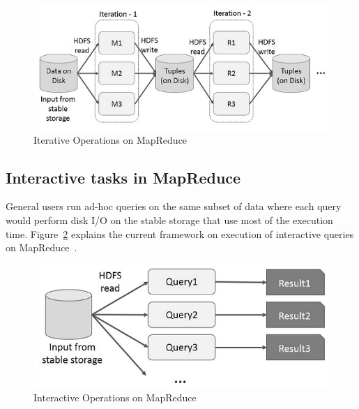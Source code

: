 \begin{figure}[!ht]
  \centering\includegraphics[width=\columnwidth]{images/iterative-MapReduce.png}
   \caption{Iterative Operations on MapReduce 
   ~\cite{hid-sp18-410-spark-RDD}}\label{fig:iterative-MapRed}
\end{figure}









\subsection{Interactive tasks in MapReduce}

General users run ad-hoc queries on the same subset of data where each query 
would perform disk I/O on the stable storage that use most of the execution time.
Figure~\ref{fig:interactive-MapRed} explains the current framework on execution 
of interactive queries on MapReduce~\cite{hid-sp18-410-spark-RDD}.






\begin{figure}[!ht]
  \centering\includegraphics[width=\columnwidth]{images/interactive-MapReduce.png}
   \caption{Interactive Operations on MapReduce
   ~\cite{hid-sp18-410-spark-RDD}}\label{fig:interactive-MapRed}
\end{figure}





